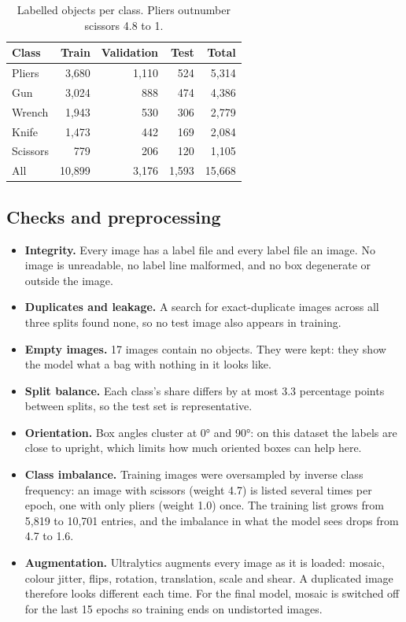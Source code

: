 \documentclass[11pt,a4paper]{article}
\begin{document}
\begin{table}[H]
\centering
\small
\begin{tabular}{@{}lrrrr@{}}
\toprule
Class & Train & Validation & Test & Total \\
\midrule
Pliers   & 3,680 & 1,110 & 524 & 5,314 \\
Gun      & 3,024 &   888 & 474 & 4,386 \\
Wrench   & 1,943 &   530 & 306 & 2,779 \\
Knife    & 1,473 &   442 & 169 & 2,084 \\
Scissors &   779 &   206 & 120 & 1,105 \\
\midrule
All      & 10,899 & 3,176 & 1,593 & 15,668 \\
\bottomrule
\end{tabular}
\caption{Labelled objects per class. Pliers outnumber scissors 4.8 to 1.}
\label{tab:classes}
\end{table}

\subsection{Checks and preprocessing}

\begin{itemize}
  \item \textbf{Integrity.} Every image has a label file and every label file an image. No image is
        unreadable, no label line malformed, and no box degenerate or outside the image.
  \item \textbf{Duplicates and leakage.} A search for exact-duplicate images across all three splits
        found none, so no test image also appears in training.
  \item \textbf{Empty images.} 17 images contain no objects. They were kept: they show the model
        what a bag with nothing in it looks like.
  \item \textbf{Split balance.} Each class's share differs by at most 3.3 percentage points between
        splits, so the test set is representative.
  \item \textbf{Orientation.} Box angles cluster at 0° and 90°: on this dataset the
        labels are close to upright, which limits how much oriented boxes can help here.
  \item \textbf{Class imbalance.} Training images were oversampled by inverse class frequency: an
        image with scissors (weight 4.7) is listed several times per epoch, one with only pliers
        (weight 1.0) once. The training list grows from 5,819 to 10,701 entries, and the imbalance
        in what the model sees drops from 4.7 to 1.6.
  \item \textbf{Augmentation.} Ultralytics augments every image as it is loaded: mosaic, colour
        jitter, flips, rotation, translation, scale and shear. A duplicated image therefore looks
        different each time. For the final model, mosaic is switched off for the last 15 epochs so
        training ends on undistorted images.
\end{itemize}
\end{document}
